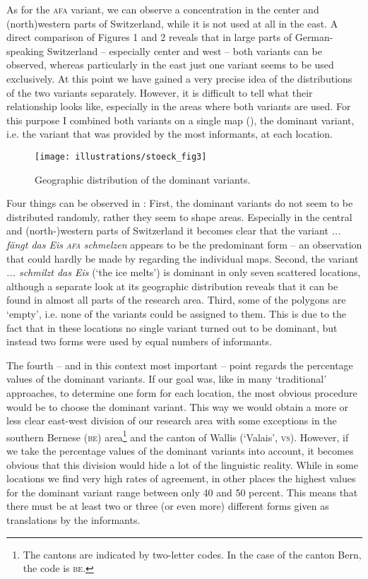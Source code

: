 \documentclass[output=paper]{LSP/langsci}
\begin{document}
As for the \textsc{afa} variant, we can observe a concentration in the center and (north)western parts of Switzerland, while it is not used at all in the east. A direct comparison of Figures 1 and 2 reveals that in large parts of German-speaking Switzerland – especially center and west – both variants can be observed, whereas particularly in the east just one variant seems to be used exclusively. At this point we have gained a very precise idea of the distributions of the two variants separately. However, it is difficult to tell what their relationship looks like, especially in the areas where both variants are used. For this purpose I combined both variants on a single map (), the dominant variant, i.e. the variant that was provided by the most informants, at each location.
 
\begin{figure}
\texttt{[image: illustrations/stoeck\_fig3]}
\label{fig:3}
\caption{Geographic distribution of the dominant variants.}
\end{figure}

Four things can be observed in : First, the dominant variants do not seem to be distributed randomly, rather they seem to shape areas. Especially in the central and (north-)western parts of Switzerland it becomes clear that the variant \emph{... fängt das Eis }\emph{\textsc{afa}}\emph{ schmelzen} appears to be the predominant form – an observation that could hardly be made by regarding the individual maps. Second, the variant \emph{... schmilzt das Eis} (‘the ice melts’) is dominant in only seven scattered locations, although a separate look at its geographic distribution reveals that it can be found in almost all parts of the research area. Third, some of the polygons are ‘empty’, i.e. none of the variants could be assigned to them. This is due to the fact that in these locations no single variant turned out to be dominant, but instead two forms were used by equal numbers of informants.

The fourth –  and in this context most important –  point regards the percentage values of the dominant variants. If our goal was, like in many ‘traditional’ approaches, to determine one form for each location, the most obvious procedure would be to choose the dominant variant. This way we would obtain a more or less clear east-west division of our research area with some exceptions in the southern Bernese (\textsc{be}) area\footnote{The cantons are indicated by two-letter codes. In the case of the canton Bern, the code is \textsc{be}.} and the canton of Wallis (‘Valais’, \textsc{vs}). However, if we take the percentage values of the dominant variants into account, it becomes obvious that this division would hide a lot of the linguistic reality. While in some locations we find very high rates of agreement, in other places the highest values for the dominant variant range between only 40 and 50 percent. This means that there must be at least two or three (or even more) different forms given as translations by the informants.
\end{document}
